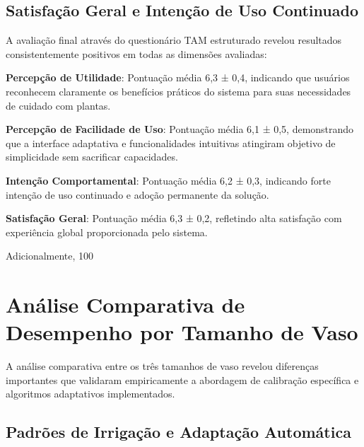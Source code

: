 
\subsection{Satisfação Geral e Intenção de Uso Continuado}

A avaliação final através do questionário TAM estruturado revelou resultados consistentemente positivos em todas as dimensões avaliadas:

\textbf{Percepção de Utilidade}: Pontuação média 6,3 ± 0,4, indicando que usuários reconhecem claramente os benefícios práticos do sistema para suas necessidades de cuidado com plantas.

\textbf{Percepção de Facilidade de Uso}: Pontuação média 6,1 ± 0,5, demonstrando que a interface adaptativa e funcionalidades intuitivas atingiram objetivo de simplicidade sem sacrificar capacidades.

\textbf{Intenção Comportamental}: Pontuação média 6,2 ± 0,3, indicando forte intenção de uso continuado e adoção permanente da solução.

\textbf{Satisfação Geral}: Pontuação média 6,3 ± 0,2, refletindo alta satisfação com experiência global proporcionada pelo sistema.

Adicionalmente, 100%

\section{Análise Comparativa de Desempenho por Tamanho de Vaso}

A análise comparativa entre os três tamanhos de vaso revelou diferenças importantes que validaram empiricamente a abordagem de calibração específica e algoritmos adaptativos implementados.

\subsection{Padrões de Irrigação e Adaptação Automática}

